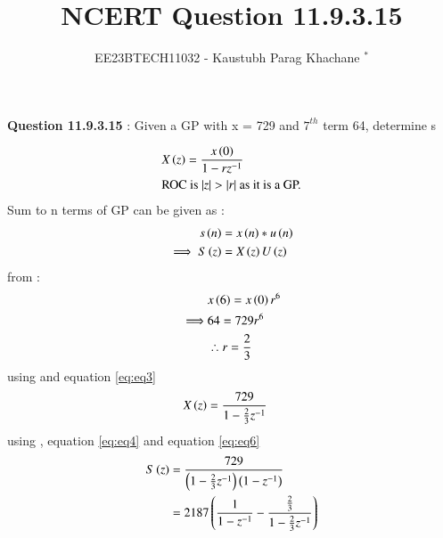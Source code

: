 \documentclass[journal,12pt,twocolumn]{IEEEtran}
\theoremstyle{remark}
\begin{document}

\vspace{3cm}

\Large\title{NCERT Question 11.9.3.15}
\large\author{EE23BTECH11032 - Kaustubh Parag Khachane $^{*}$%
}
\maketitle
\newpage
\bigskip

\renewcommand{\thefigure}{\theenumi}
\renewcommand{\thetable}{\theenumi}
\large\textbf{Question 11.9.3.15} : Given a GP with x = 729 and \(7^{th}\) term 64, determine s

\solution


\begin{align}
   & X\left(z\right) = \frac{x\left(0\right)}{1 - rz^{-1}} \label{eq:eq3}\\
   & \text{ROC is $\left\vert z\right\vert > \left\vert r\right\vert$ as it is a GP.}   
\end{align}
 Sum to n terms of GP can be given as :
\begin{align}
    s\left(n\right) &= x\left(n\right)*u\left(n\right)\\
    \implies  S\left(z\right) &= X\left(z\right)U\left(z\right)\label{eq:eq4}
\end{align}
from  :
\begin{align}
    &x\left(6\right) = x\left(0\right)r^6\\
    \implies &64 = 729r^6\\
    &\therefore r = \frac{2}{3}\label{eq:eq2}
\end{align}
using  and equation \eqref{eq:eq3}
\begin{align}
    X\left(z\right) &= \frac{729}{1 - \frac{2}{3}z^{-1}}\label{eq:eq6}
\end{align}
using , equation \eqref{eq:eq4} and equation \eqref{eq:eq6}
\begin{align}
    S\left(z\right) &= \frac{729}{\left(1 - \frac{2}{3}z^{-1}\right)\left(1-z^{-1}\right)}\\
    &= 2187\left(\frac{1}{1-z^{-1}} - \frac{\frac{2}{3}}{1 - \frac{2}{3}z^{-1}}\right) \label{eq:eq5}
\end{align}
\end{document}

